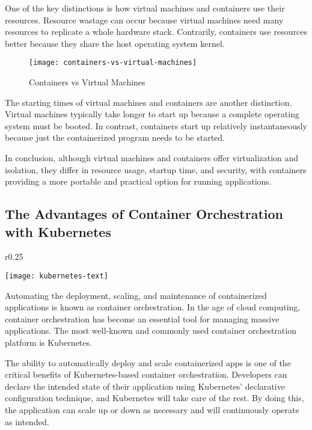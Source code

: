 One of the key distinctions is how virtual machines and containers use their resources. Resource wastage can occur because virtual machines need many resources to replicate a whole hardware stack. Contrarily, containers use resources better because they share the host operating system kernel.

\begin{figure}[H]
	\centering
	\texttt{[image: containers-vs-virtual-machines]}
	\label{fig:container-vs-vm}
	\caption{Containers vs Virtual Machines}
\end{figure}

The starting times of virtual machines and containers are another distinction. Virtual machines typically take longer to start up because a complete operating system must be booted. In contrast, containers start up relatively instantaneously because just the containerized program needs to be started.

In conclusion, although virtual machines and containers offer virtualization and isolation, they differ in resource usage, startup time, and security, with containers providing a more portable and practical option for running applications.

\subsection{The Advantages of Container Orchestration with Kubernetes}

\begin{wrapfigure}{r}{0.25\textwidth}
    \begin{center}
        \texttt{[image: kubernetes-text]}
	  \label{fig:kubernetes-logo}
    \end{center}
\end{wrapfigure}
Automating the deployment, scaling, and maintenance of containerized applications is known as container orchestration. In the age of cloud computing, container orchestration has become an essential tool for managing massive applications. The most well-known and commonly used container orchestration platform is Kubernetes.

The ability to automatically deploy and scale containerized apps is one of the critical benefits of Kubernetes-based container orchestration. Developers can declare the intended state of their application using Kubernetes' declarative configuration technique, and Kubernetes will take care of the rest. By doing this, the application can scale up or down as necessary and will continuously operate as intended.

